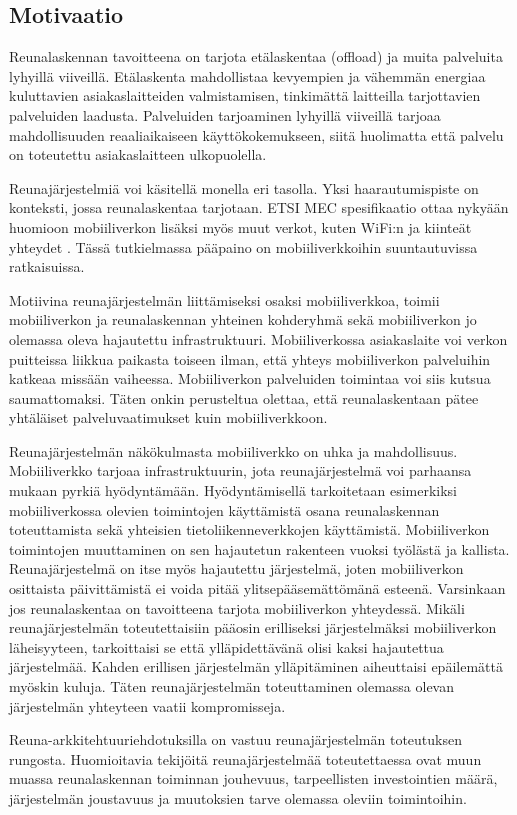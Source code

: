 \subsection{Motivaatio}
Reunalaskennan tavoitteena on tarjota etälaskentaa (offload) ja muita palveluita lyhyillä viiveillä. 
Etälaskenta mahdollistaa kevyempien ja vähemmän energiaa kuluttavien asiakaslaitteiden valmistamisen, tinkimättä laitteilla tarjottavien palveluiden laadusta.
Palveluiden tarjoaminen lyhyillä viiveillä tarjoaa mahdollisuuden reaaliaikaiseen käyttökokemukseen, siitä huolimatta että palvelu on toteutettu asiakaslaitteen ulkopuolella. 

Reunajärjestelmiä voi käsitellä monella eri tasolla. Yksi haarautumispiste on  konteksti, jossa reunalaskentaa tarjotaan. ETSI MEC spesifikaatio ottaa nykyään huomioon mobiiliverkon lisäksi myös muut verkot, kuten WiFi:n ja kiinteät yhteydet \cite{taleb2017multi}. Tässä tutkielmassa pääpaino on mobiiliverkkoihin suuntautuvissa ratkaisuissa.

Motiivina reunajärjestelmän liittämiseksi osaksi mobiiliverkkoa, toimii mobiiliverkon ja reunalaskennan yhteinen kohderyhmä sekä mobiiliverkon jo olemassa oleva hajautettu infrastruktuuri.
Mobiiliverkossa asiakaslaite voi verkon puitteissa liikkua paikasta toiseen ilman, että yhteys mobiiliverkon palveluihin katkeaa missään vaiheessa. Mobiiliverkon palveluiden toimintaa voi siis kutsua saumattomaksi. 
Täten onkin perusteltua olettaa, että reunalaskentaan pätee yhtäläiset palveluvaatimukset kuin mobiiliverkkoon.

Reunajärjestelmän näkökulmasta mobiiliverkko on uhka ja mahdollisuus. Mobiiliverkko tarjoaa infrastruktuurin, jota reunajärjestelmä voi parhaansa mukaan pyrkiä hyödyntämään.
Hyödyntämisellä tarkoitetaan esimerkiksi mobiiliverkossa olevien toimintojen käyttämistä osana reunalaskennan toteuttamista sekä yhteisien tietoliikenneverkkojen käyttämistä.
Mobiiliverkon toimintojen muuttaminen on sen hajautetun rakenteen vuoksi työlästä ja kallista. 
Reunajärjestelmä on itse myös hajautettu järjestelmä, joten mobiiliverkon osittaista päivittämistä ei voida pitää ylitsepääsemättömänä esteenä. Varsinkaan jos reunalaskentaa on tavoitteena tarjota mobiiliverkon yhteydessä. 
Mikäli reunajärjestelmän toteutettaisiin pääosin erilliseksi järjestelmäksi mobiiliverkon läheisyyteen, tarkoittaisi se että ylläpidettävänä olisi kaksi hajautettua järjestelmää. 
Kahden erillisen järjestelmän ylläpitäminen aiheuttaisi epäilemättä myöskin kuluja.
Täten reunajärjestelmän toteuttaminen olemassa olevan järjestelmän yhteyteen vaatii kompromisseja.


Reuna-arkkitehtuuriehdotuksilla on vastuu reunajärjestelmän toteutuksen rungosta.
Huomioitavia tekijöitä reunajärjestelmää toteutettaessa ovat muun muassa reunalaskennan toiminnan jouhevuus, tarpeellisten investointien määrä, järjestelmän joustavuus ja muutoksien tarve olemassa oleviin toimintoihin.

